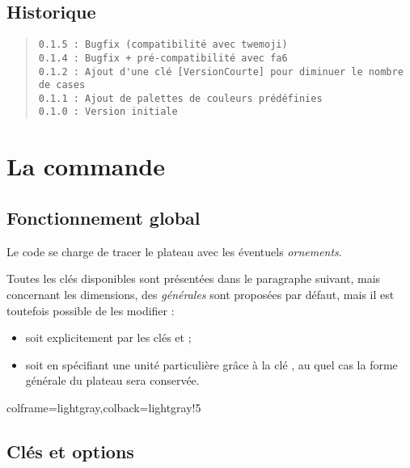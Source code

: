 \documentclass[11pt,a4paper]{ltxdoc}
\begin{document}
\vfill

\subsection{Historique}

\begin{quote}
\begin{verbatim}
0.1.5 : Bugfix (compatibilité avec twemoji)
0.1.4 : Bugfix + pré-compatibilité avec fa6
0.1.2 : Ajout d'une clé [VersionCourte] pour diminuer le nombre de cases
0.1.1 : Ajout de palettes de couleurs prédéfinies
0.1.0 : Version initiale
\end{verbatim}
\end{quote}

\pagebreak

\section{La commande}

\subsection{Fonctionnement global}

Le code se charge de tracer le plateau avec les éventuels \textit{ornements}.

Toutes les clés disponibles sont présentées dans le paragraphe suivant, mais concernant les dimensions, des \textit{générales} sont proposées par défaut, mais il est toutefois possible de les modifier :

\begin{itemize}
	\item soit explicitement par les clés \MontreCode{[Rayon=]} et \MontreCode{[HauteurCases=]} ;
	\item soit en spécifiant une unité particulière grâce à la clé \MontreCode{[Unite=]}, au quel cas la forme générale du plateau sera conservée.
\end{itemize}

\begin{tcblisting}{colframe=lightgray,colback=lightgray!5}
\PlateauTrivialPursuit[Unite=0.5]
%
\PlateauTrivialPursuit[Rayon=4,HauteurCases=1.25] %

\PlateauTrivialPursuit[Unite=0.33]
%
\PlateauTrivialPursuit[Unite=0.33,VersionCourte]
\end{tcblisting}

\pagebreak

\subsection{Clés et options}
\end{document}
